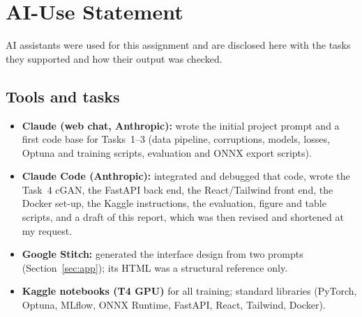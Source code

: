\section{AI-Use Statement}\label{app:ai}
AI assistants were used for this assignment and are disclosed here with the tasks they supported and how their output was checked.

\subsection{Tools and tasks}
\begin{itemize}
\item \textbf{Claude (web chat, Anthropic):} wrote the initial project prompt and a first code base for Tasks~1--3 (data pipeline, corruptions, models, losses, Optuna and training scripts, evaluation and ONNX export scripts).
\item \textbf{Claude Code (Anthropic):} integrated and debugged that code, wrote the Task~4 cGAN, the FastAPI back end, the React/Tailwind front end, the Docker set-up, the Kaggle instructions, the evaluation, figure and table scripts, and a draft of this report, which was then revised and shortened at my request.
\item \textbf{Google Stitch:} generated the interface design from two prompts (Section~\ref{sec:app}); its HTML was a structural reference only.
\item \textbf{Kaggle notebooks (T4 GPU)} for all training; standard libraries (PyTorch, Optuna, MLflow, ONNX Runtime, FastAPI, React, Tailwind, Docker).
\end{itemize}

